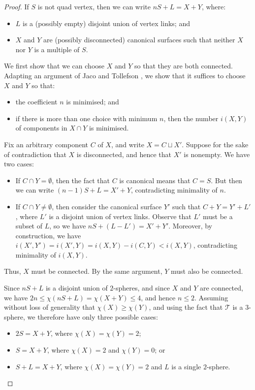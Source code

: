 \documentclass[a4paper,UKenglish,cleveref, autoref, thm-restate]{lipics-v2021}
\newcommand{\tri}{\mathcal{T}}
\begin{document}
\begin{proof}
If $S$ is not quad vertex, then we can write $nS+L = X+Y$, where:
\begin{itemize}
\item
$L$ is a (possibly empty) disjoint union of vertex links; and
\item
$X$ and $Y$ are (possibly disconnected) canonical surfaces such that neither $X$ nor $Y$ is a multiple of $S$.
\end{itemize}
We first show that we can choose $X$ and $Y$ so that they are both connected.
Adapting an argument of Jaco and Tollefson \cite{jaco1995algorithms}, we show that it suffices to choose $X$ and $Y$ so that:
\begin{itemize}
\item
the coefficient $n$ is minimised; and
\item
if there is more than one choice with minimum $n$, then the number $i(X,Y)$ of components in $X\cap Y$ is minimised.
\end{itemize}

Fix an arbitrary component $C$ of $X$, and write $X = C \sqcup X'$.
Suppose for the sake of contradiction that $X$ is disconnected, and hence that $X'$ is nonempty.
We have two cases:
\begin{itemize}
\item
If $C \cap Y = \emptyset$, then the fact that $C$ is canonical means that $C = S$.
But then we can write $(n-1)S + L = X' + Y$, contradicting minimality of $n$.
\item
If $C \cap Y \neq \emptyset$, then consider the canonical surface $Y'$ such that $C + Y = Y' + L'$, where $L'$ is a disjoint union of vertex links.
Observe that $L'$ must be a subset of $L$, so we have $nS + (L - L') = X' + Y'$.
Moreover, by construction, we have $i(X',Y') = i(X',Y) = i(X,Y) - i(C,Y) < i(X,Y)$, contradicting minimality of $i(X,Y)$.
\end{itemize}
Thus, $X$ must be connected.
By the same argument, $Y$ must also be connected.

Since $nS+L$ is a disjoint union of $2$-spheres, and since $X$ and $Y$ are connected, we have $2n \leqslant \chi(nS+L) = \chi(X+Y) \leqslant 4$, and hence $n \leqslant 2$.
Assuming without loss of generality that $\chi(X) \geqslant \chi(Y)$, and using the fact that $\tri$ is a $3$-sphere, we therefore have only three possible cases:
\begin{itemize}
\item
$2S=X+Y$, where $\chi(X)=\chi(Y)=2$;
\item
$S=X+Y$, where $\chi(X)=2$ and $\chi(Y)=0$; or
\item
$S+L=X+Y$, where $\chi(X)=\chi(Y)=2$ and $L$ is a single $2$-sphere.
\qedhere
\end{itemize}
\end{proof}
\end{document}
